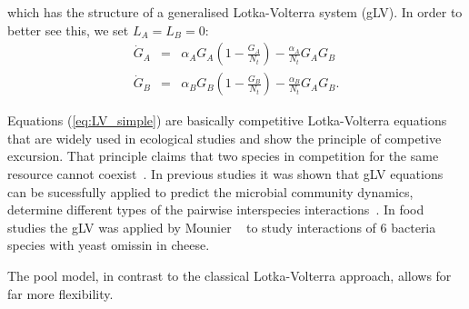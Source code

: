 \documentclass[10pt,A4paper]{article}
\begin{document}
which has the structure of a generalised Lotka-Volterra system (gLV). 
In order to better see this, we set $L_A=L_B=0$: 
\begin{eqnarray}
\label{Comp_Model}
\dot{G}_A &=& \alpha_A G_A\left(1 - \frac{G_A}{N_t}\right ) - \frac{\alpha_A}{N_t}G_AG_B\\
\dot{G}_B &=& \alpha_B G_B\left(1-\frac{G_B}{N_t}\right ) -\frac{\alpha_B}{N_t}G_AG_B. 
\label{eq:LV_simple}
\end{eqnarray} 

Equations (\ref{eq:LV_simple}) are basically competitive Lotka-Volterra equations that are widely used in ecological studies and show the principle of competive excursion.
That principle claims that two species in competition for the same resource cannot coexist~\cite{wangersky_lotka-volterra_1978}. 
In previous studies it was shown that gLV equations can be sucessfully applied to predict the microbial community dynamics, determine different types of the pairwise interspecies interactions~\cite{dedrick_when_2023, stein_ecological_2013, venturelli_deciphering_2018, hoffmann_power_2007}.
In food studies the gLV was applied by Mounier \etal~\cite{mounier_microbial_2008} to study interactions of 6 bacteria species  with yeast omissin in cheese.

The pool model, in contrast to the classical Lotka-Volterra approach, allows for far more flexibility. 
\end{document}
